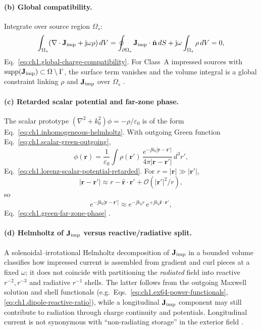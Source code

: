 \paragraph{(b) Global compatibility.}
Integrate over source region $\Omega_s$:
\[
\int_{\Omega_s}(\nabla\cdot\mathbf{J}_{\mathrm{imp}}+\mathrm{j}\omega\rho)\,dV
=\oint_{\partial\Omega_s}\mathbf{J}_{\mathrm{imp}}\cdot\hat{\mathbf{n}}\,dS+\mathrm{j}\omega\int_{\Omega_s}\rho\,dV=0,
\]
Eq.~\eqref{eq:ch1.global-charge-compatibility}. For Class~A impressed sources with $\operatorname{supp}(\mathbf{J}_{\mathrm{imp}})\subset\Omega\setminus\Gamma$, the surface term vanishes and the volume integral is a global constraint linking $\rho$ and $\mathbf{J}_{\mathrm{imp}}$ over $\Omega_s$ \cite{stratton1941}.

\paragraph{(c) Retarded scalar potential and far-zone phase.}
The scalar prototype $(\nabla^2+k_0^2)\phi=-\rho/\varepsilon_0$ is of the form Eq.~\eqref{eq:ch1.inhomogeneous-helmholtz}. With outgoing Green function Eq.~\eqref{eq:ch1.scalar-green-outgoing},
\[
\phi(\mathbf{r})=\frac{1}{\varepsilon_0}\int\rho(\mathbf{r}')\,
\frac{e^{-\jj k_0|\mathbf{r}-\mathbf{r}'|}}{4\pi|\mathbf{r}-\mathbf{r}'|}\,d^3r',
\]
Eq.~\eqref{eq:ch1.lorenz-scalar-potential-retarded}. For $r=|\mathbf{r}|\gg|\mathbf{r}'|$,
\[
|\mathbf{r}-\mathbf{r}'|\approx r-\hat{\mathbf{r}}\cdot\mathbf{r}'+\mathcal{O}(|\mathbf{r}'|^2/r),
\]
so
\[
e^{-\jj k_0|\mathbf{r}-\mathbf{r}'|}\approx e^{-\jj k_0 r}\,e^{+\jj k_0\hat{\mathbf{r}}\cdot\mathbf{r}'},
\]
Eq.~\eqref{eq:ch1.green-far-zone-phase} \cite{stratton1941,jackson1999}.

\paragraph{(d) Helmholtz of $\mathbf{J}_{\mathrm{imp}}$ versus reactive/radiative split.}
A solenoidal--irrotational Helmholtz decomposition of $\mathbf{J}_{\mathrm{imp}}$ in a bounded volume classifies how impressed current is assembled from gradient and curl pieces at a fixed $\omega$; it does not coincide with partitioning the \emph{radiated} field into reactive $r^{-2},r^{-3}$ and radiative $r^{-1}$ shells. The latter follows from the outgoing Maxwell solution and shell functionals (e.g.\ Eqs.~\eqref{eq:ch1.ex64-power-functionals}, \eqref{eq:ch1.dipole-reactive-ratio}), while a longitudinal $\mathbf{J}_{\mathrm{imp}}$ component may still contribute to radiation through charge continuity and potentials. Longitudinal current is not synonymous with ``non-radiating storage'' in the exterior field \cite{stratton1941,jackson1999}.

